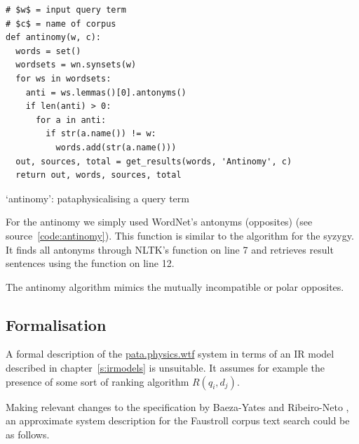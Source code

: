 \begin{listing}
  \begin{verbatim}
# $w$ = input query term
# $c$ = name of corpus
def antinomy(w, c):
  words = set()
  wordsets = wn.synsets(w)
  for ws in wordsets:
    anti = ws.lemmas()[0].antonyms()
    if len(anti) > 0:
      for a in anti:
        if str(a.name()) != w:
          words.add(str(a.name()))
  out, sources, total = get_results(words, 'Antinomy', c)
  return out, words, sources, total
  \end{verbatim}
\caption[`antinomy' function]{`antinomy': pataphysicalising a query term}
\label{code:antinomy}
\end{listing}

For the antinomy we simply used WordNet's antonyms (opposites) (see source~\ref{code:antinomy}). This function is similar to the algorithm for the syzygy. It finds all antonyms through \ac{NLTK}'s  function on line 7 and retrieves result sentences using the  function on line 12.

The antinomy algorithm mimics the mutually incompatible or polar opposites.


\subsection{Formalisation}
\label{s:formalisation}

A formal description of the \url{pata.physics.wtf} system in terms of an \ac{IR} model described in chapter~\ref{s:irmodels} is unsuitable. It assumes for example the presence of some sort of ranking algorithm $R(q_i, d_j)$.

Making relevant changes to the specification by Baeza-Yates and Ribeiro-Neto \citeyear{Baeza-Yates2011}, an approximate system description for the Faustroll corpus text search could be as follows.

